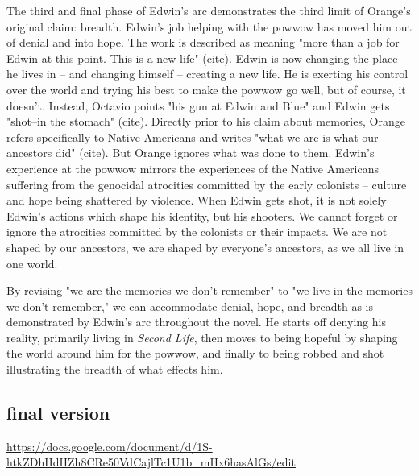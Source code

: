\documentclass[letterpaper]{article}
\begin{document}
\begin{enumerate}
The third and final phase of Edwin's arc demonstrates the third limit of
Orange's original claim: breadth. Edwin's job helping with the powwow
has moved him out of denial and into hope. The work is described as
meaning "more than a job for Edwin at this point. This is a new life"
(cite). Edwin is now changing the place he lives in -- and changing
himself -- creating a new life. He is exerting his control over the
world and trying his best to make the powwow go well, but of course, it
doesn't. Instead, Octavio points "his gun at Edwin and Blue" and Edwin
gets "shot--in the stomach" (cite). Directly prior to his claim about
memories, Orange refers specifically to Native Americans and writes
"what we are is what our ancestors did" (cite). But Orange ignores what
was done to them. Edwin's experience at the powwow mirrors the
experiences of the Native Americans suffering from the genocidal
atrocities committed by the early colonists -- culture and hope being
shattered by violence. When Edwin gets shot, it is not solely Edwin's
actions which shape his identity, but his shooters. We cannot forget or
ignore the atrocities committed by the colonists or their impacts. We
are not shaped by our ancestors, we are shaped by everyone's ancestors,
as we all live in one world.

By revising "we are the memories we don't remember" to "we live in the
memories we don't remember," we can accommodate denial, hope, and
breadth as is demonstrated by Edwin's arc throughout the novel. He
starts off denying his reality, primarily living in \emph{Second Life}, then
moves to being hopeful by shaping the world around him for the powwow,
and finally to being robbed and shot illustrating the breadth of what
effects him.
\end{enumerate}

\subsection{final version}
\label{sec:orge0b173e}
\url{https://docs.google.com/document/d/1S-htkZDhHdHZh8CRe50VdCajlTc1U1b\_mHx6hasAlGs/edit}
\end{document}
